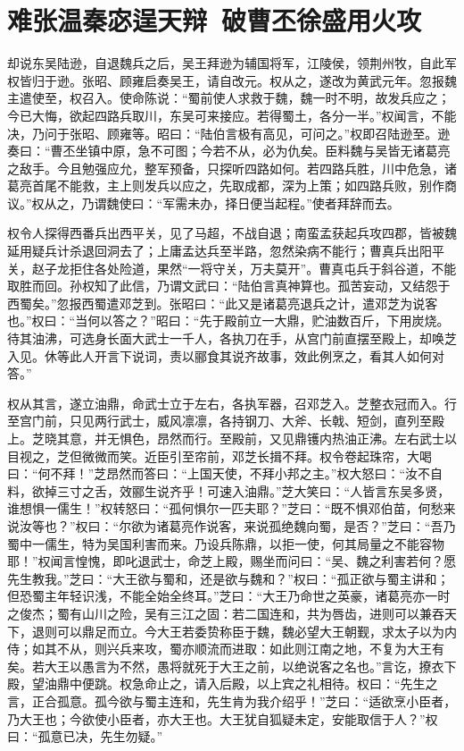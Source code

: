\chapter{难张温秦宓逞天辩~破曹丕徐盛用火攻}

却说东吴陆逊，自退魏兵之后，吴王拜逊为辅国将军，江陵侯，领荆州牧，自此军权皆归于逊。张昭、顾雍启奏吴王，请自改元。权从之，遂改为黄武元年。忽报魏主遣使至，权召入。使命陈说：“蜀前使人求救于魏，魏一时不明，故发兵应之；今已大悔，欲起四路兵取川，东吴可来接应。若得蜀土，各分一半。”权闻言，不能决，乃问于张昭、顾雍等。昭曰：“陆伯言极有高见，可问之。”权即召陆逊至。逊奏曰：“曹丕坐镇中原，急不可图；今若不从，必为仇矣。臣料魏与吴皆无诸葛亮之敌手。今且勉强应允，整军预备，只探听四路如何。若四路兵胜，川中危急，诸葛亮首尾不能救，主上则发兵以应之，先取成都，深为上策；如四路兵败，别作商议。”权从之，乃谓魏使曰：“军需未办，择日便当起程。”使者拜辞而去。

权令人探得西番兵出西平关，见了马超，不战自退；南蛮孟获起兵攻四郡，皆被魏延用疑兵计杀退回洞去了；上庸孟达兵至半路，忽然染病不能行；曹真兵出阳平关，赵子龙拒住各处险道，果然“一将守关，万夫莫开”。曹真屯兵于斜谷道，不能取胜而回。孙权知了此信，乃谓文武曰：“陆伯言真神算也。孤苦妄动，又结怨于西蜀矣。”忽报西蜀遣邓芝到。张昭曰：“此又是诸葛亮退兵之计，遣邓芝为说客也。”权曰：“当何以答之？”昭曰：“先于殿前立一大鼎，贮油数百斤，下用炭烧。待其油沸，可选身长面大武士一千人，各执刀在手，从宫门前直摆至殿上，却唤芝入见。休等此人开言下说词，责以郦食其说齐故事，效此例烹之，看其人如何对答。”

权从其言，遂立油鼎，命武士立于左右，各执军器，召邓芝入。芝整衣冠而入。行至宫门前，只见两行武士，威风凛凛，各持钢刀、大斧、长戟、短剑，直列至殿上。芝晓其意，并无惧色，昂然而行。至殿前，又见鼎镬内热油正沸。左右武士以目视之，芝但微微而笑。近臣引至帘前，邓芝长揖不拜。权令卷起珠帘，大喝曰：“何不拜！”芝昂然而答曰：“上国天使，不拜小邦之主。”权大怒曰：“汝不自料，欲掉三寸之舌，效郦生说齐乎！可速入油鼎。”芝大笑曰：“人皆言东吴多贤，谁想惧一儒生！”权转怒曰：“孤何惧尔一匹夫耶？”芝曰：“既不惧邓伯苗，何愁来说汝等也？”权曰：“尔欲为诸葛亮作说客，来说孤绝魏向蜀，是否？”芝曰：“吾乃蜀中一儒生，特为吴国利害而来。乃设兵陈鼎，以拒一使，何其局量之不能容物耶！”权闻言惶愧，即叱退武士，命芝上殿，赐坐而问曰：“吴、魏之利害若何？愿先生教我。”芝曰：“大王欲与蜀和，还是欲与魏和？”权曰：“孤正欲与蜀主讲和；但恐蜀主年轻识浅，不能全始全终耳。”芝曰：“大王乃命世之英豪，诸葛亮亦一时之俊杰；蜀有山川之险，吴有三江之固：若二国连和，共为唇齿，进则可以兼吞天下，退则可以鼎足而立。今大王若委贽称臣于魏，魏必望大王朝觐，求太子以为内侍；如其不从，则兴兵来攻，蜀亦顺流而进取：如此则江南之地，不复为大王有矣。若大王以愚言为不然，愚将就死于大王之前，以绝说客之名也。”言讫，撩衣下殿，望油鼎中便跳。权急命止之，请入后殿，以上宾之礼相待。权曰：“先生之言，正合孤意。孤今欲与蜀主连和，先生肯为我介绍乎！”芝曰：“适欲烹小臣者，乃大王也；今欲使小臣者，亦大王也。大王犹自狐疑未定，安能取信于人？”权曰：“孤意已决，先生勿疑。”

